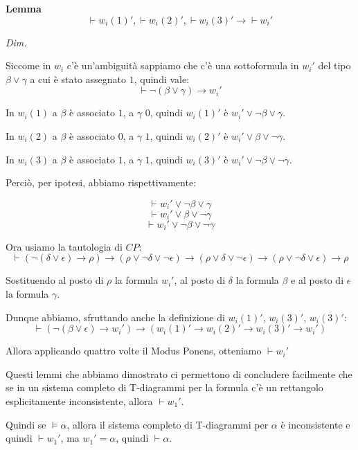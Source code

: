 \documentclass[a4paper, titlepage, 12pt]{report}
\begin{document}
\begin{flushleft}
\textbf{Lemma}
$$\vdash w_i(1)', \vdash w_i(2)', \vdash w_i(3)' \rightarrow \vdash w_i'$$

\textit{Dim.}

Siccome in $w_i$ c'è un'ambiguità sappiamo che c'è una sottoformula in $w_i'$
del tipo $\beta \lor \gamma$ a cui è stato assegnato $1$, quindi vale:
$$\vdash \neg (\beta \lor \gamma) \rightarrow w_i'$$

In $w_i(1)$ a $\beta$ è associato $1$, a $\gamma$ $0$, quindi $w_i(1)'$ è $w_i' \lor \neg \beta \lor \gamma$.

In $w_i(2)$ a $\beta$ è associato $0$, a $\gamma$ $1$, quindi $w_i(2)'$ è $w_i' \lor \beta \lor \neg \gamma$.

In $w_i(3)$ a $\beta$ è associato $1$, a $\gamma$ $1$, quindi $w_i(3)'$ è $w_i' \lor \neg \beta \lor \neg \gamma$.

Perciò, per ipotesi, abbiamo rispettivamente:

$$\vdash w_i' \lor \neg \beta \lor \gamma$$
$$\vdash w_i' \lor \beta \lor \neg \gamma$$
$$\vdash w_i' \lor \neg \beta \lor \neg \gamma$$

Ora usiamo la tautologia di $CP$:
$$\vdash (\neg (\delta \lor \epsilon) \rightarrow \rho) \rightarrow
         (\rho \lor \neg \delta \lor \neg \epsilon) \rightarrow (\rho \lor \delta \lor \neg \epsilon)
           \rightarrow (\rho \lor \neg \delta \lor \epsilon) \rightarrow \rho$$

Sostituendo al posto di $\rho$ la formula $w_i'$, al posto di $\delta$ la formula $\beta$
e al posto di $\epsilon$ la formula $\gamma$.

Dunque abbiamo, sfruttando anche la definizione di $w_i(1)'$, $w_i(3)'$, $w_i(3)'$:
$$\vdash (\neg (\beta \lor \epsilon) \rightarrow w_i') \rightarrow
         (w_i(1)' \rightarrow w_i(2)' \rightarrow w_i(3)' \rightarrow w_i')$$

Allora applicando quattro volte il Modus Ponens, otteniamo $\vdash w_i'$
\end{flushleft}

Questi lemmi che abbiamo dimostrato ci permettono di concludere facilmente
che se in un sistema completo di T-diagrammi per la formula c'è un rettangolo esplicitamente inconsistente,
allora $\vdash w_1'$.

Quindi se $\vDash \alpha$, allora il sistema completo di T-diagrammi per $\alpha$ è inconsistente
e quindi $\vdash w_1'$, ma $w_1' = \alpha$, quindi $\vdash \alpha$.
\end{document}
